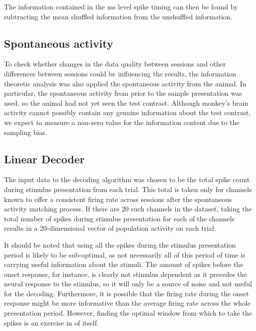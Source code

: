 The information contained in the \unit[4]{ms} level spike timing can then be found by subtracting the mean shuffled information from the unshuffled information.

\FloatBarrier
\subsection{Spontaneous activity}

To check whether changes in the data quality between sessions and other differences between sessions could be influencing the results, the information theoretic analysis was also applied the spontaneous activity from the animal.
In particular, the spontaneous activity from prior to the sample presentation was used, so the animal had not yet seen the test contrast.
Although monkey's brain activity cannot possibly contain any genuine information about the test contrast, we expect to measure a non-zero value for the information content due to the sampling bias.

\subsection{Linear Decoder}
\label{sec:dec-meth-lin}

The input data to the decoding algorithm was chosen to be the total spike count during stimulus presentation from each trial. This total is taken only for channels known to offer a consistent firing rate across sessions after the spontaneous activity matching process. If there are 20 such channels in the dataset, taking the total number of spikes during stimulus presentation for each of the channels results in a 20-dimensional vector of population activity on each trial.

It should be noted that using all the spikes during the stimulus presentation period is likely to be sub-optimal, as not necessarily all of this period of time is carrying useful information about the stimuli. The amount of spikes before the onset response, for instance, is clearly not stimulus dependent as it precedes the neural response to the stimulus, so it will only be a source of noise and  not useful for the decoding.
Furthermore, it is possible that the firing rate during the onset response might be more informative than the average firing rate across the whole presentation period. However, finding the optimal window from which to take the spikes is an exercise in of itself.


